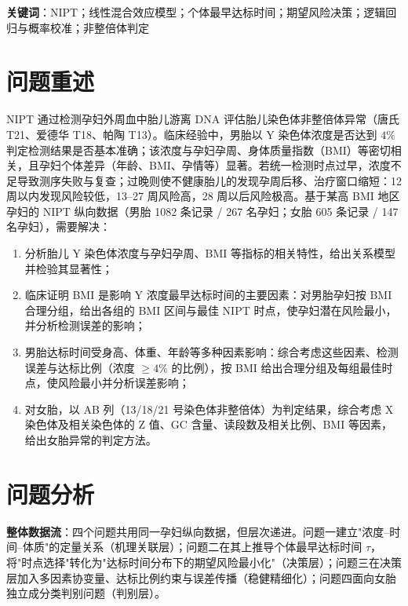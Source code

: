 \documentclass[11pt,a4paper]{ctexart}
\begin{document}
\vspace{2pt}
\noindent\textbf{关键词}：NIPT；线性混合效应模型；个体最早达标时间；期望风险决策；逻辑回归与概率校准；非整倍体判定

\tableofcontents
\newpage

\section{问题重述}
NIPT 通过检测孕妇外周血中胎儿游离 DNA 评估胎儿染色体非整倍体异常（唐氏 T21、爱德华 T18、帕陶 T13）。临床经验中，男胎以 Y 染色体浓度是否达到 $4\%$ 判定检测结果是否基本准确；该浓度与孕妇孕周、身体质量指数（BMI）等密切相关，且孕妇个体差异（年龄、BMI、孕情等）显著。若统一检测时点过早，浓度不足导致测序失败与复查；过晚则使不健康胎儿的发现孕周后移、治疗窗口缩短：12 周以内发现风险较低，13--27 周风险高，28 周以后风险极高。基于某高 BMI 地区孕妇的 NIPT 纵向数据（男胎 1082 条记录 / 267 名孕妇；女胎 605 条记录 / 147 名孕妇），需要解决：

\begin{enumerate}
\item 分析胎儿 Y 染色体浓度与孕妇孕周、BMI 等指标的相关特性，给出关系模型并检验其显著性；
\item 临床证明 BMI 是影响 Y 浓度最早达标时间的主要因素：对男胎孕妇按 BMI 合理分组，给出各组的 BMI 区间与最佳 NIPT 时点，使孕妇潜在风险最小，并分析检测误差的影响；
\item 男胎达标时间受身高、体重、年龄等多种因素影响：综合考虑这些因素、检测误差与达标比例（浓度 $\ge4\%$ 的比例），按 BMI 给出合理分组及每组最佳时点，使风险最小并分析误差影响；
\item 对女胎，以 AB 列（13/18/21 号染色体非整倍体）为判定结果，综合考虑 X 染色体及相关染色体的 Z 值、GC 含量、读段数及相关比例、BMI 等因素，给出女胎异常的判定方法。
\end{enumerate}

\section{问题分析}
\textbf{整体数据流}：四个问题共用同一孕妇纵向数据，但层次递进。问题一建立"浓度--时间--体质"的定量关系（机理关联层）；问题二在其上推导个体最早达标时间 $\tau$，将"时点选择"转化为"达标时间分布下的期望风险最小化"（决策层）；问题三在决策层加入多因素协变量、达标比例约束与误差传播（稳健精细化）；问题四面向女胎独立成分类判别问题（判别层）。
\end{document}
